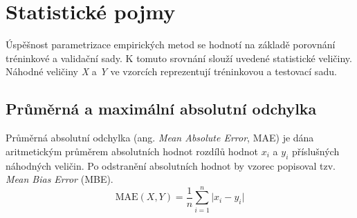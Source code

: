 


\section{Statistické pojmy}
Úspěšnost parametrizace empirických metod se hodnotí na základě porovnání tréninkové a validační sady. K tomuto srovnání slouží uvedené statistické veličiny. Náhodné veličiny \textit{X} a \textit{Y} ve vzorcích reprezentují tréninkovou a testovací sadu.

\subsection{Průměrná a maximální absolutní odchylka}
Průměrná absolutní odchylka (ang. \textit{Mean Absolute Error}, MAE) je dána aritmetickým průměrem absolutních hodnot rozdílů hodnot $x_i$ a $y_i$ příslušných náhodných veličin. Po odstranění absolutních hodnot by vzorec popisoval tzv. \textit{Mean Bias Error} (MBE). 
\begin{equation}
    \text{MAE}(X,Y) = \frac{1}{n} \sum_{i=1}^n \lvert x_i - y_i \rvert
\end{equation}

